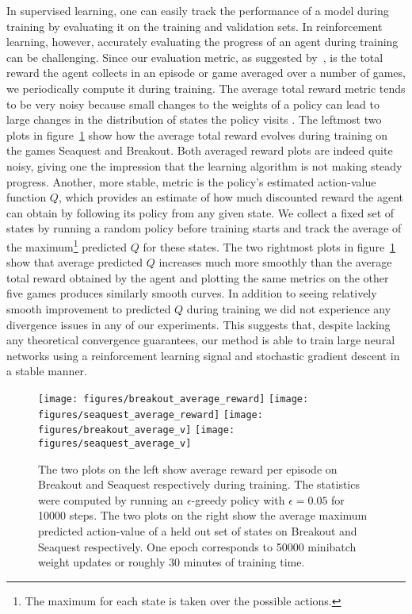 \documentclass{article} \usepackage{nips13submit_e,times}
\begin{document}
In supervised learning, one can easily track the performance of a model during training by evaluating it on the training and validation sets. In reinforcement learning, however, accurately evaluating the progress of an agent during training can be challenging. 
Since our evaluation metric, as suggested by~\cite{bellemare-ale}, is the total reward the agent collects in an episode or game averaged over a number of games, we periodically compute it during training. The average total reward metric tends to be very noisy because small changes to the weights of a policy can lead to large changes in the distribution of states the policy visits .  The leftmost two plots in figure~\ref{fig-V} show how the average total reward evolves during training on the games Seaquest and Breakout.  Both averaged reward plots are indeed quite noisy, giving one the impression that the learning algorithm is not making steady progress.  Another, more stable, metric is the policy's estimated action-value function $Q$, which provides an estimate of how much discounted reward the agent can obtain by following its policy from any given state.  We collect a fixed set of states by running a random policy before training starts and track the average of the maximum\footnote{The maximum for each state is taken over the possible actions.} predicted $Q$ for these states.  The two rightmost plots in figure~\ref{fig-V} show that average predicted $Q$ increases much more smoothly than the average total reward obtained by the agent and plotting the same metrics on the other five games produces similarly smooth curves.
In addition to seeing relatively smooth improvement to predicted $Q$ during training we did not experience any divergence issues in any of our experiments.  This suggests that, despite lacking any theoretical convergence guarantees, our method is able to train large neural networks using a reinforcement learning signal and stochastic gradient descent in a stable manner.  




\begin{figure}
\texttt{[image: figures/breakout\_average\_reward]}
\texttt{[image: figures/seaquest\_average\_reward]}
\texttt{[image: figures/breakout\_average\_v]}
\texttt{[image: figures/seaquest\_average\_v]}
\caption{\label{fig-V} The two plots on the left show average reward per episode on Breakout and Seaquest respectively during training.  The statistics were computed by running an $\epsilon$-greedy policy with $\epsilon=0.05$ for 10000 steps. The two plots on the right show the average maximum predicted action-value of a held out set of states on Breakout and Seaquest respectively.  One epoch corresponds to 50000 minibatch weight updates or roughly 30 minutes of training time.}
\end{figure}
\end{document}
